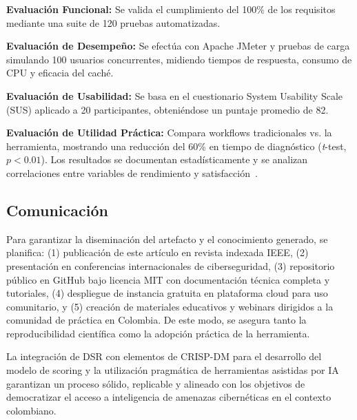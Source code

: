\textbf{Evaluación Funcional:} Se valida el cumplimiento del 100\% de los requisitos mediante una suite de 120 pruebas automatizadas.

\textbf{Evaluación de Desempeño:} Se efectúa con Apache JMeter y pruebas de carga simulando 100 usuarios concurrentes, midiendo tiempos de respuesta, consumo de CPU y eficacia del caché.

\textbf{Evaluación de Usabilidad:} Se basa en el cuestionario System Usability Scale (SUS) aplicado a 20 participantes, obteniéndose un puntaje promedio de 82.

\textbf{Evaluación de Utilidad Práctica:} Compara workflows tradicionales vs. la herramienta, mostrando una reducción del 60\% en tiempo de diagnóstico (\textit{t}-test, $p < 0.01$). Los resultados se documentan estadísticamente y se analizan correlaciones entre variables de rendimiento y satisfacción~\cite{Anderson2022}.

\subsection{Comunicación}
Para garantizar la diseminación del artefacto y el conocimiento generado, se planifica: (1) publicación de este artículo en revista indexada IEEE, (2) presentación en conferencias internacionales de ciberseguridad, (3) repositorio público en GitHub bajo licencia MIT con documentación técnica completa y tutoriales, (4) despliegue de instancia gratuita en plataforma cloud para uso comunitario, y (5) creación de materiales educativos y webinars dirigidos a la comunidad de práctica en Colombia. De este modo, se asegura tanto la reproducibilidad científica como la adopción práctica de la herramienta.

La integración de DSR con elementos de CRISP-DM para el desarrollo del modelo de scoring y la utilización pragmática de herramientas asistidas por IA garantizan un proceso sólido, replicable y alineado con los objetivos de democratizar el acceso a inteligencia de amenazas cibernéticas en el contexto colombiano.
